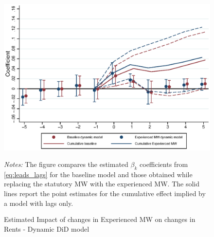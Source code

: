 \begin{figure}[!h]
	\centering
	\caption{Estimated Impact of changes in Experienced MW on changes in Rents - Dynamic DiD model}
	\label{fig:expmw_dynamic}
	\includegraphics[width = .9\textwidth]{../../analysis/first_differences_expmw/output/fd_model_comparison_expmw.eps}
	\begin{minipage}{.9\textwidth}\footnotesize
		\textit{Notes:} The figure compares the estimated $\beta_{k}$ coefficients from \autoref{eq:leads_lags} for the baseline model and those obtained while replacing the statutory MW with the experienced MW. The solid lines report the point estimates for the cumulative effect implied by a model with lags only.  
	\end{minipage}
\end{figure}


